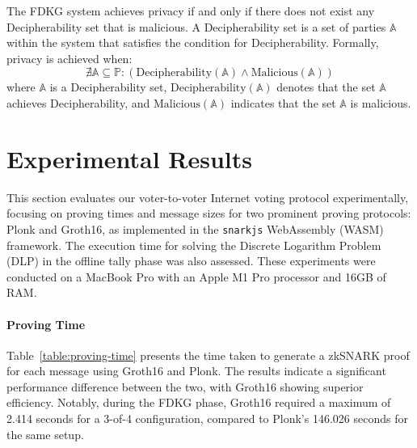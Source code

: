\documentclass[runningheads]{llncs}
\begin{document}
\begin{definition}[Privacy] \label{def:privacy}
    The FDKG system achieves privacy if and only if there does not exist any Decipherability set that is malicious. A Decipherability set is a set of parties \( \mathbb{A} \) within the system that satisfies the condition for Decipherability. Formally, privacy is achieved when:
    \[
    \nexists \mathbb{A} \subseteq \mathbb{P} : (\text{Decipherability}(\mathbb{A}) \land \text{Malicious}(\mathbb{A}))
    \]
    where \( \mathbb{A} \) is a Decipherability set, \( \text{Decipherability}(\mathbb{A}) \) denotes that the set \( \mathbb{A} \) achieves Decipherability, and \( \text{Malicious}(\mathbb{A}) \) indicates that the set \( \mathbb{A} \) is malicious.
\end{definition}


\section{Experimental Results}

This section evaluates our voter-to-voter Internet voting protocol experimentally, focusing on proving times and message sizes for two prominent proving protocols: Plonk and Groth16, as implemented in the \texttt{snarkjs} WebAssembly (WASM) framework. The execution time for solving the Discrete Logarithm Problem (DLP) in the offline tally phase was also assessed. These experiments were conducted on a MacBook Pro with an Apple M1 Pro processor and 16GB of RAM.

\paragraph{Proving Time}

Table~\ref{table:proving-time} presents the time taken to generate a zkSNARK proof for each message using Groth16 and Plonk. The results indicate a significant performance difference between the two, with Groth16 showing superior efficiency. Notably, during the FDKG phase, Groth16 required a maximum of 2.414 seconds for a 3-of-4 configuration, compared to Plonk's 146.026 seconds for the same setup.
\end{document}
